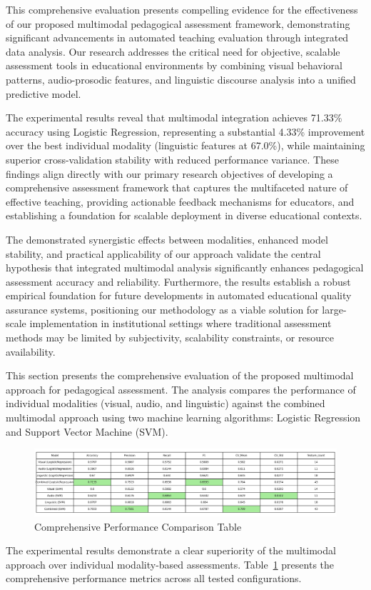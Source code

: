 
This comprehensive evaluation presents compelling evidence for the effectiveness of our proposed multimodal pedagogical assessment framework, demonstrating significant advancements in automated teaching evaluation through integrated data analysis. Our research addresses the critical need for objective, scalable assessment tools in educational environments by combining visual behavioral patterns, audio-prosodic features, and linguistic discourse analysis into a unified predictive model. 

The experimental results reveal that multimodal integration achieves 71.33\% accuracy using Logistic Regression, representing a substantial 4.33\% improvement over the best individual modality (linguistic features at 67.0\%), while maintaining superior cross-validation stability with reduced performance variance. These findings align directly with our primary research objectives of developing a comprehensive assessment framework that captures the multifaceted nature of effective teaching, providing actionable feedback mechanisms for educators, and establishing a foundation for scalable deployment in diverse educational contexts.

The demonstrated synergistic effects between modalities, enhanced model stability, and practical applicability of our approach validate the central hypothesis that integrated multimodal analysis significantly enhances pedagogical assessment accuracy and reliability. Furthermore, the results establish a robust empirical foundation for future developments in automated educational quality assurance systems, positioning our methodology as a viable solution for large-scale implementation in institutional settings where traditional assessment methods may be limited by subjectivity, scalability constraints, or resource availability.

This section presents the comprehensive evaluation of the proposed multimodal approach for pedagogical assessment. The analysis compares the performance of individual modalities (visual, audio, and linguistic) against the combined multimodal approach using two machine learning algorithms: Logistic Regression and Support Vector Machine (SVM).

\begin{figure}[H]
    \centering
    \includegraphics[width=1\textwidth]{sections/performance_table.jpeg}
    \caption{Comprehensive Performance Comparison Table}
    \label{fig:performance_table}
\end{figure}
The experimental results demonstrate a clear superiority of the multimodal approach over individual modality-based assessments. Table~\ref{fig:performance_table} presents the comprehensive performance metrics across all tested configurations.

